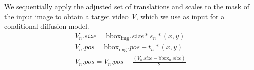 We sequentially apply the adjusted set of translations and scales to the mask of the input image to obtain a target video \textit{V}, which we use as input for a conditional diffusion model\cite{2023videocomposer}.
\begin{equation}
    \begin{gathered}
        V_{n}.size = \text{bbox}_\text{img}.size*s_{n}*(x,y) \\
        V_{n}.pos = \text{bbox}_\text{img}.pos + t_{n}*(x,y) \\
        V_{n}.pos = V_{n}.pos - \frac{(V_{n}.size-\text{bbox}_{n}.size)}{2}
    \end{gathered}
\end{equation}
